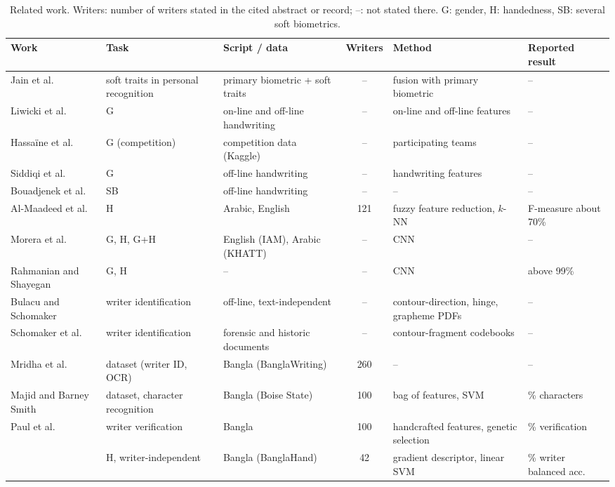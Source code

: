 \documentclass[conference,a4paper]{IEEEtran}
\begin{document}
\begin{table}[t]
\caption{Related work. Writers: number of writers stated in the cited abstract or record; --: not stated there. G: gender, H: handedness, SB: several soft biometrics.}
\label{tab:related}
\centering\scriptsize
\setlength{\tabcolsep}{3pt}
\begin{tabular}{l>{\raggedright\arraybackslash}p{2.7cm}>{\raggedright\arraybackslash}p{3.1cm}c>{\raggedright\arraybackslash}p{3.4cm}>{\raggedright\arraybackslash}p{2.3cm}}
\toprule
Work & Task & Script / data & Writers & Method & Reported result \\
\midrule
Jain et al.\ \cite{jain2004soft} & soft traits in personal recognition & primary biometric + soft traits & -- & fusion with primary biometric & -- \\
Liwicki et al.\ \cite{liwicki2011gender} & G & on-line and off-line handwriting & -- & on-line and off-line features & -- \\
Hassa\"ine et al.\ \cite{hassaine2013icdar} & G (competition) & competition data (Kaggle) & -- & 194 participating teams & -- \\
Siddiqi et al.\ \cite{siddiqi2015gender} & G & off-line handwriting & -- & handwriting features & -- \\
Bouadjenek et al.\ \cite{bouadjenek2016soft} & SB & off-line handwriting & -- & -- & -- \\
Al-Maadeed et al.\ \cite{almaadeed2016handedness} & H & Arabic, English & 121 & fuzzy feature reduction, $k$-NN & F-measure about 70\% \\
Morera et al.\ \cite{morera2018handedness} & G, H, G+H & English (IAM), Arabic (KHATT) & -- & CNN & -- \\
Rahmanian and Shayegan \cite{rahmanian2021handedness} & G, H & -- & -- & CNN & above 99\% \\
Bulacu and Schomaker \cite{bulacu2007text} & writer identification & off-line, text-independent & -- & contour-direction, hinge, grapheme PDFs & -- \\
Schomaker et al.\ \cite{schomaker2007codebooks} & writer identification & forensic and historic documents & -- & contour-fragment codebooks & -- \\
Mridha et al.\ \cite{mridha2021banglawriting} & dataset (writer ID, OCR) & Bangla (BanglaWriting) & 260 & -- & -- \\
Majid and Barney Smith \cite{majid2018bangla} & dataset, character recognition & Bangla (Boise State) & 100 & bag of features, SVM & 95.4\% characters \\
Paul et al.\ \cite{paul2024bangla} & writer verification & Bangla & 100 & handcrafted features, genetic selection & 94.54\% verification \\
\cite{anon2026handedness} & H, writer-independent & Bangla (BanglaHand) & 42 & gradient descriptor, linear SVM & 77.4\% writer balanced acc. \\
\bottomrule
\end{tabular}
\end{table}
\end{document}
